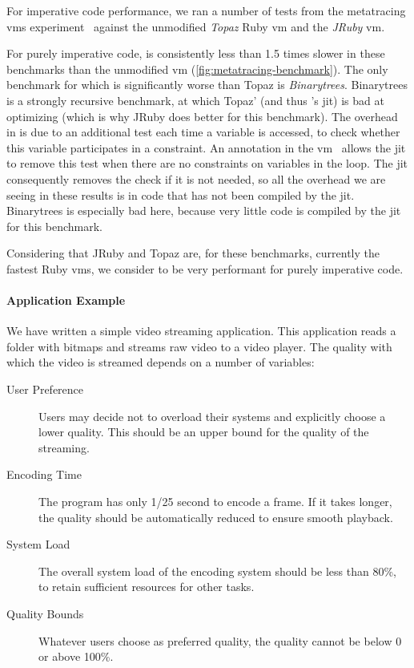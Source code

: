 For imperative code performance, we ran a number of tests from the
metatracing \acp{vm} experiment~\cite{bolz2013impact} against the
unmodified \emph{Topaz} Ruby \ac{vm} and the \emph{JRuby} \ac{vm}.

For purely imperative code, \toolname is consistently less than 1.5
times slower in these benchmarks than the unmodified \ac{vm}
(\autoref{fig:metatracing-benchmark}). The only benchmark for which
\toolname is significantly worse than Topaz is
\emph{Binarytrees}. Binarytrees is a strongly recursive benchmark,
at which Topaz' (and thus \toolname's \ac{jit}) is bad at optimizing
(which is why JRuby does better for this benchmark). The overhead in
\toolname is due to an additional test each time a variable is
accessed, to check whether this variable participates in a
constraint. An annotation in the \ac{vm}~\cite{bolz2011runtime} allows
the \ac{jit} to remove this test when there are no constraints on
variables in the loop. The \ac{jit} consequently removes the check if
it is not needed, so all the overhead we are seeing in these results
is in code that has not been compiled by the \ac{jit}. 
Binarytrees is especially bad here, because very little code is 
compiled by the \ac{jit} for this benchmark.

Considering that JRuby and Topaz are, for these benchmarks, currently
the fastest Ruby \acp{vm}, we consider \toolname to be very performant
for purely imperative code.

\paragraph{Application Example}
We have written a simple video streaming application. This application
reads a folder with bitmaps and streams raw video to a video
player. The quality with which the video is streamed depends on a
number of variables:
\begin{description}
\item[User Preference] Users may decide not to overload their systems
  and explicitly choose a lower quality. This should be an upper
  bound for the quality of the streaming.
\item[Encoding Time] The program has only 1/25 second to encode a
  frame. If it takes longer, the quality should be automatically
  reduced to ensure smooth playback.
\item[System Load] The overall system load of the encoding system
  should be less than 80\%, to retain sufficient resources for other tasks.
\item[Quality Bounds] Whatever users choose as preferred quality, the
  quality cannot be below 0 or above 100\%.
\end{description}

